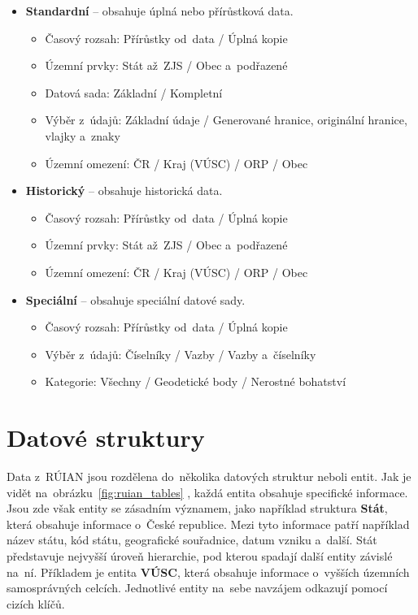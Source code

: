 \begin{itemize}
    \item \textbf{Standardní} -- obsahuje úplná nebo přírůstková data.
    \begin{itemize}[itemsep=-1pt]
        \item Časový rozsah: Přírůstky od~data / Úplná kopie
        \item Územní prvky: Stát až~ZJS / Obec a~podřazené
        \item Datová sada: Základní / Kompletní
        \item Výběr z~údajů: Základní údaje / Generované hranice, originální hranice, vlajky a~znaky
        \item Územní omezení: ČR / Kraj (VÚSC) / ORP / Obec
    \end{itemize}

    \item \textbf{Historický} -- obsahuje historická data.
    \begin{itemize}[itemsep=-1pt]
        \item Časový rozsah: Přírůstky od~data / Úplná kopie
        \item Územní prvky: Stát až~ZJS / Obec a~podřazené
        \item Územní omezení: ČR / Kraj (VÚSC) / ORP / Obec
    \end{itemize}

    \item \textbf{Speciální} -- obsahuje speciální datové sady.
    \begin{itemize}[itemsep=-1pt]
        \item Časový rozsah: Přírůstky od~data / Úplná kopie
        \item Výběr z~údajů: Číselníky / Vazby / Vazby a~číselníky
        \item Kategorie: Všechny / Geodetické body / Nerostné bohatství
    \end{itemize}
\end{itemize}

\section{Datové struktury}
Data z~RÚIAN jsou rozdělena do~několika datových struktur neboli entit.
Jak je vidět na~obrázku~\ref{fig:ruian_tables} \cite{ruian_vfr}, každá entita obsahuje specifické informace.
Jsou zde však entity se zásadním významem, jako například struktura \textbf{Stát}, která obsahuje informace o~České republice.
Mezi tyto informace patří například název státu, kód státu, geografické souřadnice, datum vzniku a~další.
Stát představuje nejvyšší úroveň hierarchie, pod kterou spadají další entity závislé na~ní.
Příkladem je entita \textbf{VÚSC}, která obsahuje informace o~vyšších územních samosprávných celcích.
Jednotlivé entity na~sebe navzájem odkazují pomocí cizích klíčů.

